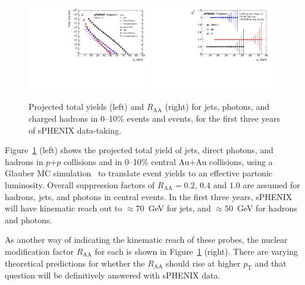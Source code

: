 \begin{figure}[h]
\centering
\includegraphics[width=0.48\textwidth]{figs/master_Years13_yields.pdf}
\includegraphics[width=0.48\textwidth]{figs/RAA_jet_1.pdf}
\caption{Projected total yields (left) and $R_\mathrm{AA}$ (right) for
  jets, photons, and charged hadrons in 0--10\% \auau events and \pp
  events, for the first three years of sPHENIX data-taking.}
\label{fig:jet_RAA_proj}
\end{figure}

Figure~\ref{fig:jet_RAA_proj} (left) shows the projected total yield of
jets, direct photons, and hadrons in $p$+$p$ collisions and in 0--10\%
central Au+Au collisions, using a Glauber MC
simulation~\cite{Miller:2007ri} to translate \auau event yields to an
effective partonic luminosity. Overall suppression factors of
$R_\mathrm{AA} = 0.2$, $0.4$ and $1.0$ are assumed for hadrons, jets,
and photons in central \auau events. In the first three years, sPHENIX
will have kinematic reach out to $\approx 70$~GeV for jets, and
$\approx 50$~GeV for hadrons and photons.

As another way of indicating the kinematic reach of these probes, the
nuclear modification factor $R_\mathrm{AA}$ for each is shown in
Figure~\ref{fig:jet_RAA_proj} (right).   There are varying theoretical predictions
for whether the $R_\mathrm{AA}$ should rise at higher $p_\mathrm{T}$ and that question will be 
definitively answered with sPHENIX data.


